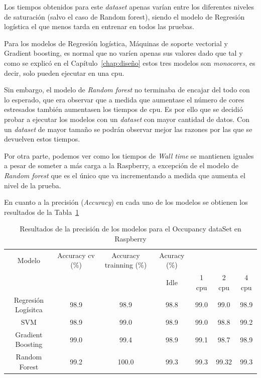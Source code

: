 \documentclass[a4paper, 12pt]{book}
\begin{document}
Los tiempos obtenidos para este \textit{dataset} apenas varían entre los diferentes niveles de saturación (salvo el caso de Random forest), siendo el modelo de Regresión logística el que menos tarda en entrenar en todos las pruebas. 

Para los modelos de Regresión logística, Máquinas de soporte vectorial y Gradient boosting, es normal que no varíen apenas sus valores dado que tal y como se explicó en el Capítulo~\ref{chap:diseño} estos tres modelos son \textit{monocores}, es decir, solo pueden ejecutar en una cpu. 

Sin embargo, el modelo de \textit{Random forest} no terminaba de encajar del todo con lo esperado, que era observar que a medida que aumentase el número de cores estresados también aumentasen los tiempos de cpu. Es por ello que se decidió probar a ejecutar los modelos con un \textit{dataset} con mayor cantidad de datos. Con un \textit{dataset} de mayor tamaño se podrán observar mejor las razones por las que se devuelven estos tiempos.

Por otra parte, podemos ver como los tiempos de \textit{Wall time} se mantienen iguales a pesar de someter a más carga a la Raspberry, a excepción de el modelo de \textit{Random forest} que es el único que va incrementando a medida que aumenta el nivel de la prueba. 

En cuanto a la precisión (\textit{Accuracy}) en cada uno de los modelos se obtienen los resultados de la Tabla~\ref{tab:acc_Occraspberry}

\begin{table}[]
\begin{adjustbox}{width=\textwidth}
\centering
    \begin{tabular}{c  c  c  c  c  c  c}
    \hline
    Modelo & Accuracy cv (\%) & Accuracy trainning (\%) & Acuracy (\%) & & & \\
    \cline{4-7}
     &   &   &  Idle & 1 cpu & 2 cpu & 4 cpu \\
     \hline
     Regresión Logísitca & 98.9 & 98.9 & 98.8 & 99.0 & 99.0 & 98.9\\
     SVM & 98.9 & 99.0 & 98.9 & 99.0 & 98.8 & 99.2\\
     Gradient Boosting & 99.0 & 99.4 & 98.9 & 99.1 & 98.7 & 98.9\\
     Random Forest & 99.2 & 100.0 & 99.3 & 99.3 & 99.32 & 99.3\\
    \hline
    \end{tabular}
\end{adjustbox}
\caption{Resultados de la precisión de los modelos para el Occupancy dataSet en Raspberry}
\label{tab:acc_Occraspberry}
\end{table}
\end{document}
